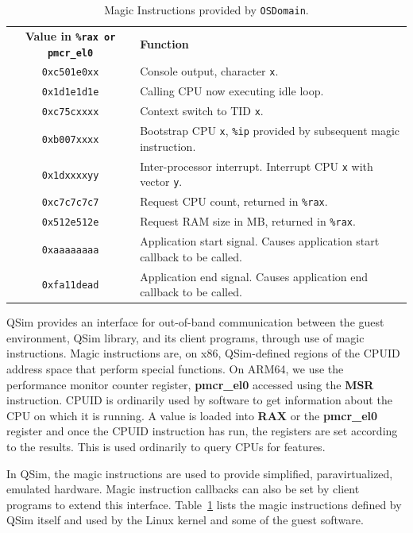\documentclass[letterpaper, 10pt]{book}
\begin{document}
\begin{table}
\begin{tabular}{c|l}
    \textbf{Value in \texttt{\%rax or pmcr\_el0}}&\textbf{Function}\\
  \texttt{0xc501e0xx}&Console output, character \texttt{x}.\\
  \texttt{0x1d1e1d1e}&Calling CPU now executing idle loop.\\
  \texttt{0xc75cxxxx}&Context switch to TID \texttt{x}.\\
  \texttt{0xb007xxxx}&Bootstrap CPU \texttt{x}, \texttt{\%ip} provided by
                      subsequent magic instruction.\\
  \texttt{0x1dxxxxyy}&Inter-processor interrupt. Interrupt CPU \texttt{x} with
                      vector \texttt{y}.\\
  \texttt{0xc7c7c7c7}&Request CPU count, returned in \texttt{\%rax}.\\
  \texttt{0x512e512e}&Request RAM size in MB, returned in \texttt{\%rax}.\\
  \texttt{0xaaaaaaaa}&Application start signal. Causes application start 
                      callback to be called.\\
  \texttt{0xfa11dead}&Application end signal. Causes application end callback
                      to be called.\\
\end{tabular}
\caption{Magic Instructions provided by \texttt{OSDomain}.}
\label{table:magic}
\end{table}

QSim provides an interface for out-of-band communication between the guest
environment, QSim library, and its client programs, through use of magic
instructions. Magic instructions are, on x86,  QSim-defined regions of the CPUID address
space that perform special functions. On ARM64, we use the performance monitor
counter register, \textbf{pmcr\_el0} accessed using the \textbf{MSR} instruction.
CPUID is ordinarily used by software to get information about the CPU on which
it is running. A value is loaded into \textbf{RAX} or the \textbf{pmcr\_el0} register
and once the CPUID instruction has run, the registers are set according to the
results. This is used ordinarily to query CPUs for features.

In QSim, the magic instructions are used to provide simplified, paravirtualized,
emulated hardware. Magic instruction callbacks can also be set by client
programs to extend this interface. Table~\ref{table:magic} lists the magic
instructions defined by QSim itself and used by the Linux kernel and some of the
guest software.
\end{document}
